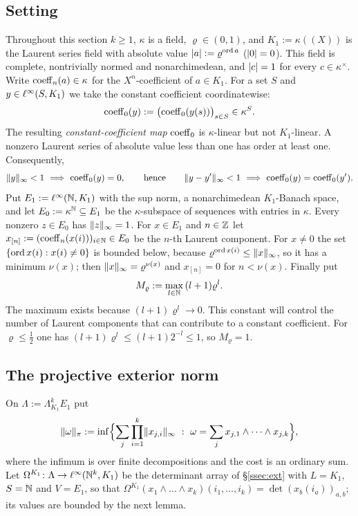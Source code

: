 \subsection{Setting}\label{ssec:laurentsetting}
Throughout this section $k\ge1$, $\kappa$ is a field, $\varrho\in(0,1)$, and $K_1:=\kappa((X))$ is the Laurent series field with
absolute value $\lvert a\rvert:=\varrho^{\operatorname{ord} a}$ ($\lvert 0\rvert=0$). This field is complete, nontrivially normed and nonarchimedean, and
$\lvert c\rvert=1$ for every $c\in\kappa^\times$. Write $\operatorname{coeff}_n(a)\in\kappa$ for the $X^n$\nobreakdash-coefficient of $a\in K_1$.
For a set $S$ and $y\in\ell^\infty(S,K_1)$ we take the constant coefficient coordinatewise:
\[
\operatorname{coeff}_0(y):=\bigl(\operatorname{coeff}_0(y(s))\bigr)_{s\in S}\in\kappa^S.
\]
The resulting \emph{constant-coefficient map} $\operatorname{coeff}_0$ is $\kappa$\nobreakdash-linear but not $K_1$\nobreakdash-linear.
A nonzero Laurent series of absolute value less than one has order at least one. Consequently,
\begin{equation}\label{eq:small}
\norm y_\infty<1\ \Longrightarrow\ \coeff_0(y)=0,\qquad\text{hence}\qquad \norm{y-y'}_\infty<1\ \Longrightarrow\ \coeff_0(y)=\coeff_0(y').
\end{equation}
Put $E_1:=\ell^\infty(\mathbb N,K_1)$ with the sup norm, a nonarchimedean $K_1$\nobreakdash-Banach space, and let $E_0:=\kappa^\mathbb N\subseteq E_1$ be
the $\kappa$\nobreakdash-subspace of sequences with entries in $\kappa$. Every nonzero $z\in E_0$ has $\lVert z\rVert_\infty=1$. For
$x\in E_1$ and $n\in\mathbb Z$ let $x_{[n]}:=(\operatorname{coeff}_n(x(i)))_{i\in\mathbb N}\in E_0$ be the $n$\nobreakdash-th Laurent component. For $x\ne0$
the set $\{\operatorname{ord} x(i):x(i)\ne0\}$ is bounded below, because $\varrho^{\operatorname{ord} x(i)}\le\lVert x\rVert_\infty$, so it has a minimum
$\nu(x)$; then $\lVert x\rVert_\infty=\varrho^{\nu(x)}$ and $x_{[n]}=0$ for $n<\nu(x)$. Finally put
\[
M_\varrho:=\max_{l\in\mathbb N}\,(l+1)\varrho^l .
\]
The maximum exists because $(l+1)\varrho^l\to0$. This constant will control the number of Laurent components that can
contribute to a constant coefficient. For $\varrho\le\frac12$ one has $(l+1)\varrho^l\le(l+1)2^{-l}\le1$, so $M_\varrho=1$.

\subsection{The projective exterior norm}\label{ssec:projnorm}
On $\Lambda:=\Lambda^k_{K_1}E_1$ put
\[
\norm\omega_\pi:=\inf\Bigl\{\sum_j\prod_{i=1}^k\norm{x_{j,i}}_\infty\ :\ \omega=\sum_jx_{j,1}\wedge\dots\wedge x_{j,k}\Bigr\},
\]
where the infimum is over finite decompositions and the cost is an ordinary sum. Let $\Omega^{K_1}\colon\Lambda\to\ell^\infty(\mathbb N^k,K_1)$ be the determinant
array of \S\ref{ssec:ext} with $L=K_1$, $S=\mathbb N$ and $V=E_1$, so that
$\Omega^{K_1}(x_1\wedge\dots\wedge x_k)(i_1,\dots,i_k)=\det(x_b(i_a))_{a,b}$; its values are bounded by the next lemma.

